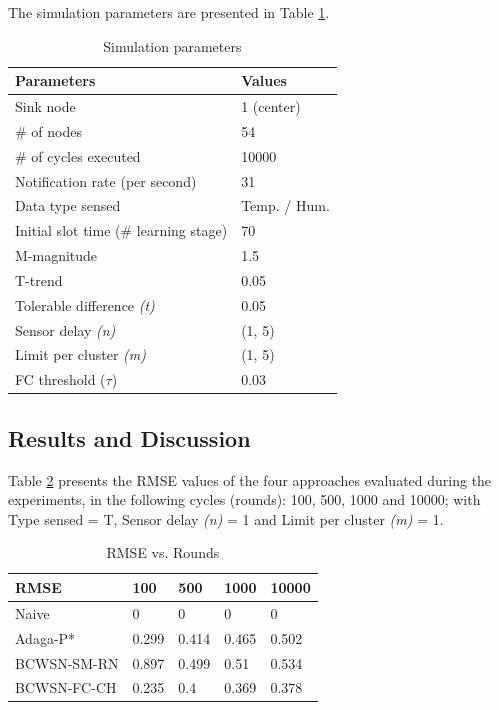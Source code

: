 \documentclass[conference]{IEEEtran}
\begin{document}
The simulation parameters are presented in Table \ref{tab:parameters}.

\begin{table}[h!]
\caption{Simulation parameters}
\label{tab:parameters}
\begin{center}
\begin{tabular}{|l||l|}
\hline
Parameters &Values\\
\hline\hline
Sink node &1 (center) \\
\hline
\# of nodes &54 \\
\hline
\# of cycles executed &10000 \\
\hline
Notification rate (per second) &31 \\
\hline
Data type sensed &Temp. / Hum. \\
\hline
Initial slot time (\# learning stage) &70 \\
\hline
M-magnitude &1.5 \\
\hline
T-trend &0.05 \\
\hline
Tolerable difference {\it(t)} &0.05 \\
\hline
Sensor delay {\it(n)} &(1, 5) \\
\hline
Limit per cluster {\it(m)} &(1, 5) \\
\hline
FC threshold ($\tau$) &0.03 \\
\hline
\end{tabular}
\end{center}
\end{table}


\subsection{Results and Discussion}
\label{results-and-discussion}

Table \ref{tab:rmseVsRounds} presents the RMSE values of the four approaches
evaluated during the experiments, in the following cycles (rounds): 100, 500,
1000 and 10000; with Type sensed = T, Sensor delay {\it(n)} = 1 and Limit per
cluster {\it(m)} = 1.

\begin{table}[h!]
\caption{RMSE vs. Rounds}
\label{tab:rmseVsRounds}
\begin{center}
\begin{tabular}{|l||l|l|l|l|}
\hline
RMSE &100 &500 &1000 &10000 \\
\hline\hline
Naive &0 &0 &0 &0 \\
\hline
Adaga-P* &0.299 &0.414 &0.465 &0.502 \\
\hline
BCWSN-SM-RN &0.897 &0.499 &0.51 &0.534 \\
\hline
BCWSN-FC-CH &0.235 &0.4 &0.369 &0.378 \\
\hline
\end{tabular}
\end{center}
\end{table}
\end{document}
